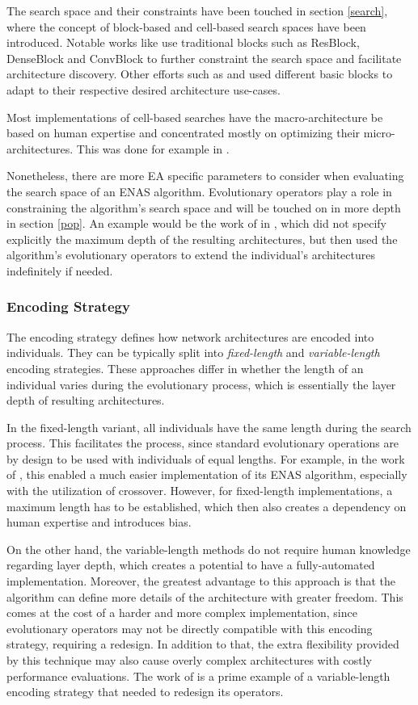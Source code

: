 \documentclass[10pt,        %
               a4paper,     %
               journal,     %
               ]{IEEEtran}
\begin{document}
The search space and their constraints have been touched in section \ref{search}, where the concept of block-based and cell-based
search spaces have been introduced. Notable works like \cite{sun2019completely} use traditional blocks such as ResBlock, DenseBlock
and ConvBlock to further constraint the search space and facilitate architecture discovery. Other efforts such as
\cite{chen2019auto} and \cite{song2020efficient} used different basic blocks to adapt to their respective desired architecture
use-cases.

Most implementations of cell-based searches have the macro-architecture be based on human expertise and concentrated mostly
on optimizing their micro-architectures. This was done for example in \cite{real2019regularized}.

Nonetheless, there are more EA specific
parameters to consider when evaluating the search space of an ENAS algorithm. Evolutionary operators play a role in
constraining the algorithm's search space and will be touched on in more depth in section \ref{pop}. An example would be the
work of in \cite{irwin2019graph}, which did not specify explicitly the maximum depth of the
resulting architectures, but then used the algorithm's evolutionary operators to extend the individual's architectures
indefinitely if needed.

\subsubsection{Encoding Strategy}
The encoding strategy defines how network architectures are encoded into individuals. They can be typically split into
\textit{fixed-length} and \textit{variable-length} encoding strategies. These approaches differ in whether the length
of an individual varies during the evolutionary process, which is essentially the layer depth of resulting architectures.

In the fixed-length variant, all individuals have the same length during the search process. This facilitates
the process, since standard evolutionary operations are by design to be used with individuals of equal lengths. For example,
in the work of \cite{xie2017genetic}, this enabled a much easier implementation of its ENAS
algorithm, especially with the utilization of crossover. However, for fixed-length implementations, a maximum
length has to be established, which then also creates a dependency on human expertise and introduces bias.

On the other hand, the variable-length methods do not require human knowledge regarding layer depth, which creates
a potential to have a fully-automated implementation. Moreover, the greatest advantage to this approach is that the algorithm
can define more details of the architecture with greater freedom. This comes at the cost of a harder and more complex implementation,
since evolutionary operators may not be directly compatible with this encoding strategy, requiring a redesign. In addition to that,
the extra flexibility provided by this technique may also cause overly complex architectures with costly performance evaluations.
The work of \cite{sun2019evolving} is a prime example of a variable-length encoding strategy that needed to redesign its operators.
\end{document}
